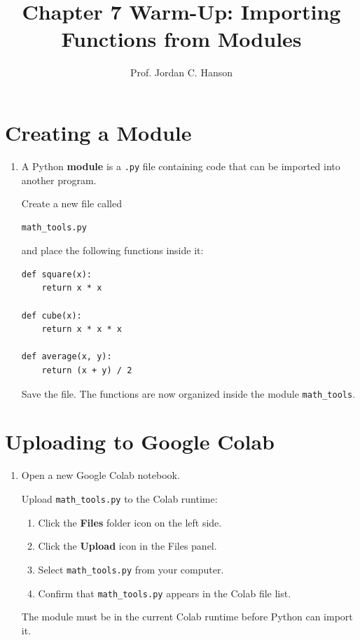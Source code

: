 \documentclass{article}
\begin{document}
\twocolumn

\title{Chapter 7 Warm-Up: Importing Functions from Modules}
\author{Prof. Jordan C. Hanson}
\date{}

\maketitle

\section{Creating a Module}

\begin{enumerate}

\item A Python \textbf{module} is a \texttt{.py} file containing
code that can be imported into another program.

Create a new file called

\begin{verbatim}
math_tools.py
\end{verbatim}

and place the following functions inside it:

\begin{verbatim}
def square(x):
    return x * x

def cube(x):
    return x * x * x

def average(x, y):
    return (x + y) / 2
\end{verbatim}

Save the file.  The functions are now organized inside the
module \texttt{math\_tools}.

\end{enumerate}


\section{Uploading to Google Colab}

\begin{enumerate}

\item Open a new Google Colab notebook.

Upload \texttt{math\_tools.py} to the Colab runtime:

\begin{enumerate}[label=\arabic*.]
\item Click the \textbf{Files} folder icon on the left side.
\item Click the \textbf{Upload} icon in the Files panel.
\item Select \texttt{math\_tools.py} from your computer.
\item Confirm that \texttt{math\_tools.py} appears in the
      Colab file list.
\end{enumerate}

The module must be in the current Colab runtime before Python can
import it.

\end{enumerate}
\end{document}
